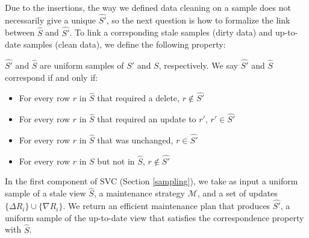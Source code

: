 Due to the insertions, the way we defined data cleaning on a sample does not necessarily give a unique $\hat{S'}$, so the next question is how to formalize the link between $\hat{S}$ and $\hat{S'}$. 
To link a corrsponding stale samples (dirty data) and up-to-date samples (clean data), we define the following property:
\begin{definition}[Correspondence]
$\hat{S'}$ and $\hat{S}$ are uniform samples of $S'$ and $S$, respectively.  We say $\hat{S'}$ and $\hat{S}$ correspond if and only if:
\begin{itemize}[noitemsep]
\item For every row $r$ in $\hat{S}$ that required a delete, $r \not\in \hat{S'}$
\item For every row $r$ in $\hat{S}$ that required an update to $r'$, $r' \in \hat{S'}$
\item For every row $r$ in $\hat{S}$  that was unchanged, $r \in \hat{S'}$
\item For every row $r$ in $S$ but not in $\hat{S}$, $r \not\in \hat{S'}$
\end{itemize}
\label{correspondence}
\end{definition}

In the first component of SVC (Section \ref{sampling}), we take as input a uniform sample of a stale view $\hat{S}$, a maintenance strategy $\mathcal{M}$, and a set of updates $\{\Delta R_i\} \cup \{\nabla R_i\}$.
We return an efficient maintenance plan that produces $\hat{S'}$, a uniform sample of the up-to-date view that satisfies the correspondence property with $\hat{S}$.

